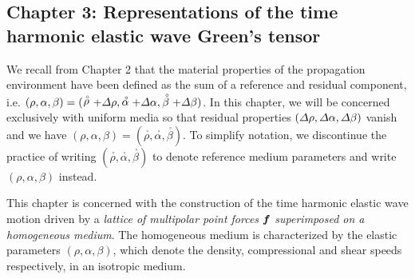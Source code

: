 \documentclass[11pt]{article}
\newcommand{\bmi}[1]{\mbox{\boldmath$\mit #1$\unboldmath}}
\newcommand{\rf}[1]{\stackrel{\scriptscriptstyle _{\,\,\circ}}{ #1}}
\begin{document}
\newpage

\subsection*{Chapter 3: Representations of the time harmonic elastic wave Green's tensor}

We recall from Chapter 2 that
 the material
properties of the propagation environment have been defined as
the sum of a reference and residual component, i.e.
$(\rho, \alpha, \beta)=(\rf{\rho}+{\mit \Delta}\rho,\rf{\alpha}+{\mit
\Delta}\alpha,\rf{\beta}+{\mit \Delta}\beta)$. In this chapter, we will
be concerned exclusively with uniform media so that
residual properties $({\mit \Delta}\rho,{\mit
\Delta}\alpha,{\mit \Delta}\beta)$ vanish and we have
$(\rho, \alpha, \beta)=(\rf{\rho},\rf{\alpha},\rf{\beta})$. To simplify
notation, we discontinue the practice of writing  $(\rf{\rho},\rf{\alpha},\rf{\beta})$
to denote reference medium parameters and write
$({\rho},{\alpha},{\beta})$ instead.

This chapter is concerned with the construction of the time harmonic
elastic wave motion driven by a {\em lattice of multipolar point forces\/}
${\bmi f}$ {\em  superimposed on a homogeneous medium\/}.
The homogeneous medium is
characterized by the  elastic parameters $(\rho,\alpha,\beta)$, which
denote the density, compressional and shear speeds respectively, in an
isotropic medium.
\end{document}
